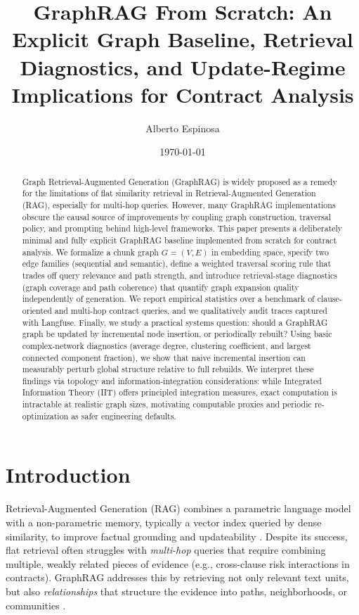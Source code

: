 \documentclass[11pt]{article}
\title{GraphRAG From Scratch: An Explicit Graph Baseline, Retrieval Diagnostics, and Update-Regime Implications for Contract Analysis}
\author{Alberto Espinosa}
\date{\today}
\begin{document}
\maketitle

\begin{abstract}
Graph Retrieval-Augmented Generation (GraphRAG) is widely proposed as a remedy for the limitations of flat similarity retrieval in Retrieval-Augmented Generation (RAG), especially for multi-hop queries. However, many GraphRAG implementations obscure the causal source of improvements by coupling graph construction, traversal policy, and prompting behind high-level frameworks. This paper presents a deliberately minimal and fully explicit GraphRAG baseline implemented from scratch for contract analysis. We formalize a chunk graph $G=(V,E)$ in embedding space, specify two edge families (sequential and semantic), define a weighted traversal scoring rule that trades off query relevance and path strength, and introduce retrieval-stage diagnostics (graph coverage and path coherence) that quantify graph expansion quality independently of generation. We report empirical statistics over a benchmark of clause-oriented and multi-hop contract queries, and we qualitatively audit traces captured with Langfuse. Finally, we study a practical systems question: should a GraphRAG graph be updated by incremental node insertion, or periodically rebuilt? Using basic complex-network diagnostics (average degree, clustering coefficient, and largest connected component fraction), we show that naive incremental insertion can measurably perturb global structure relative to full rebuilds. We interpret these findings via topology and information-integration considerations: while Integrated Information Theory (IIT) offers principled integration measures, exact computation is intractable at realistic graph sizes, motivating computable proxies and periodic re-optimization as safer engineering defaults.
\end{abstract}

\section{Introduction}
Retrieval-Augmented Generation (RAG) combines a parametric language model with a non-parametric memory, typically a vector index queried by dense similarity, to improve factual grounding and updateability \citep{lewis2020rag}. Despite its success, flat retrieval often struggles with \emph{multi-hop} queries that require combining multiple, weakly related pieces of evidence (e.g., cross-clause risk interactions in contracts). GraphRAG addresses this by retrieving not only relevant text units, but also \emph{relationships} that structure the evidence into paths, neighborhoods, or communities \citep{peng2024graphrag_survey,han2024graphrag_survey}.
\end{document}
